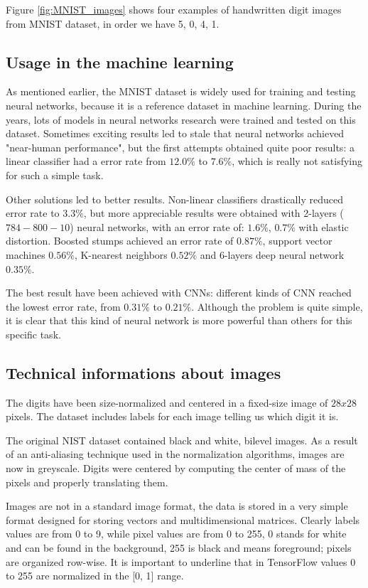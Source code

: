 Figure \ref{fig:MNIST_images} shows four examples of handwritten digit images from \acs{MNIST} dataset, in order we have 5, 0, 4, 1.

\subsection{Usage in the machine learning}

As mentioned earlier, the \acs{MNIST} dataset is widely used for training and testing neural networks, because it is a reference dataset in machine learning. During the years, lots of models in neural networks research were trained and tested on this dataset. Sometimes exciting results led to stale that neural networks achieved "near-human performance", but the first attempts obtained quite poor results: a linear classifier had a error rate from $12.0 \%$ to $7.6 \%$, which is really not satisfying for such a simple task.

Other solutions led to better results. Non-linear classifiers drastically reduced error rate to $3.3 \%$, but more appreciable results were obtained with 2-layers ($784-800-10$) neural networks, with an error rate of: $1.6 \%$, $0.7 \%$ with elastic distortion. Boosted stumps achieved an error rate of $0.87 \%$, support vector machines $0.56 \%$, K-nearest neighbors $0.52 \%$ and 6-layers deep neural network $0.35 \%$.

The best result have been achieved with \acsp{CNN}: different kinds of \acs{CNN} reached the lowest error rate, from $0.31 \%$ to $0.21 \%$. Although the problem is quite simple, it is clear that this kind of neural network is more powerful than others for this specific task.

\subsection{Technical informations about images}

The digits have been size-normalized and centered in a fixed-size image of $28x28$ pixels. The dataset includes labels for each image telling us which digit it is.

The original NIST dataset contained black and white, bilevel images. As a result of an anti-aliasing technique used in the normalization algorithms, images are now in greyscale. Digits were centered by computing the center of mass of the pixels and properly translating them.

Images are not in a standard image format, the data is stored in a very simple format designed for storing vectors and multidimensional matrices. Clearly labels values are from 0 to 9, while pixel values are from 0 to 255, 0 stands for white and can be found in the background, 255 is black and means foreground; pixels are organized row-wise. It is important to underline that in TensorFlow values 0 to 255 are normalized in the [0, 1] range.

